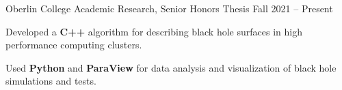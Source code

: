 \begin{entry}{Oberlin College}
	\entryItem
		{Academic Research, Senior Honors Thesis}
		{Fall 2021 -- Present}
		
		\begin{items}
			\item Developed a \textbf{C++} algorithm for describing black hole surfaces in high performance computing clusters.
			\item Used \textbf{Python} and \textbf{ParaView} for data analysis and visualization of black hole simulations and tests.
		\end{items}
\end{entry}
